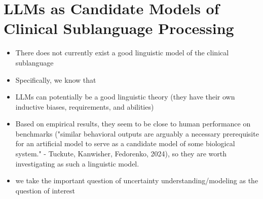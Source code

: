 


 
\section{LLMs as Candidate Models of Clinical Sublanguage Processing}
\begin{itemize}
    \item There does not currently exist a good linguistic model of the clinical sublanguage
    \item Specifically, we know that 
    \item LLMs can potentially be a good linguistic theory (they have their own inductive biases, requirements, and abilities)
    \item Based on empirical results, they seem to be close to human performance on benchmarks ("similar behavioral outputs are arguably a necessary prerequisite for an artificial model to serve as a candidate model of some biological system." - Tuckute, Kanwisher, Fedorenko, 2024), so they are worth investigating as such a linguistic model.
    \item we take the important question of uncertainty understanding/modeling as the question of interest
\end{itemize}

